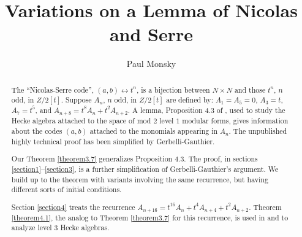 \documentclass{monsky2009}
\begin{document}
\addtolength{\parskip}{-2pt}


\begin{frontmatter}






\title{Variations on a Lemma of Nicolas and Serre}
\author{Paul Monsky}

\address{Brandeis University, Waltham MA  02454-9110, USA. monsky@brandeis.edu}

\begin{abstract}
The ``Nicolas-Serre code'',  $(a,b) \leftrightarrow t^{n}$, is a bijection between $N\times N$ and those $t^{n}$, $n$ odd, in $Z/2[t]$. Suppose $A_{n}$, $n$ odd, in $Z/2[t]$ are defined by: $A_{1}= A_{5}= 0$, $A_{3}= t$, $A_{7}= t^{5}$, and $A_{n+8}= t^{8} A_{n} + t^{2} A_{n+2}$. A lemma, Proposition 4.3 of \cite{6}, used to study the Hecke algebra attached to the space of mod $2$ level $1$ modular forms, gives information about the codes $(a,b)$ attached to the monomials appearing in $A_{n}$. The unpublished highly technical proof has been simplified by Gerbelli-Gauthier.

Our Theorem \ref{theorem3.7} generalizes Proposition 4.3. The proof, in sections \ref{section1}--\ref{section3}, is a further simplification of Gerbelli-Gauthier's argument. We build up to the theorem with variants involving the same recurrence, but having different sorts of initial conditions.

Section \ref{section4} treats the recurrence $A_{n+16}= t^{16} A_{n} + t^{4} A_{n+4} + t^{2} A_{n+2}$. Theorem \ref{theorem4.1}, the analog to Theorem \ref{theorem3.7} for this recurrence, is used in \cite{2} and \cite{3} to analyze level 3 Hecke algebras.


\end{abstract}
\end{frontmatter}
\end{document}
